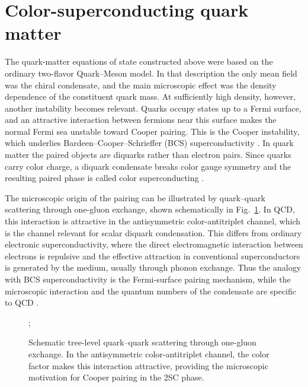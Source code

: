 \section{Color-superconducting quark matter}

The quark-matter equations of state constructed above were based on the
ordinary two-flavor Quark--Meson model. In that description the only
mean field was the chiral condensate, and the main microscopic effect was
the density dependence of the constituent quark mass. At sufficiently high
density, however, another instability becomes relevant. Quarks occupy
states up to a Fermi surface, and an attractive interaction between
fermions near this surface makes the normal Fermi sea unstable toward
Cooper pairing. This is the Cooper instability, which underlies
Bardeen--Cooper--Schrieffer (BCS) superconductivity
\cite{Cooper1956,Bardeen1957}. In quark matter the paired objects are
diquarks rather than electron pairs. Since quarks carry color charge, a
diquark condensate breaks color gauge symmetry and the resulting paired
phase is called color superconducting \cite{Shovkovy2005,Alford2008}.

The microscopic origin of the pairing can be illustrated by quark--quark
scattering through one-gluon exchange, shown schematically in
Fig.~\ref{fig:qq_one_gluon_exchange}. In QCD, this interaction is
attractive in the antisymmetric color-antitriplet channel, which is the
channel relevant for scalar diquark condensation. This differs from
ordinary electronic superconductivity, where the direct electromagnetic
interaction between electrons is repulsive and the effective attraction
in conventional superconductors is generated by the medium, usually
through phonon exchange. Thus the analogy with BCS superconductivity is
the Fermi-surface pairing mechanism, while the microscopic interaction
and the quantum numbers of the condensate are specific to QCD
\cite{Shovkovy2005,Alford2008}.

\begin{figure}[htbp]
\centering
{};
\caption{Schematic tree-level quark--quark scattering through one-gluon
exchange. In the antisymmetric color-antitriplet channel, the color factor
makes this interaction attractive, providing the microscopic motivation for
Cooper pairing in the 2SC phase.}
\label{fig:qq_one_gluon_exchange}
\end{figure}

